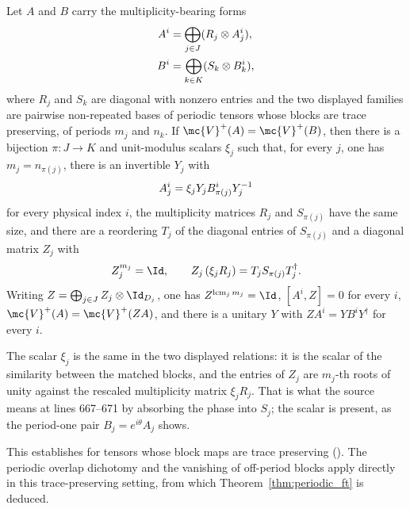 \begin{theorem}%
    \label{thm:periodic_ft_equal_case_trace_preserving}
    \leanok
    Let $A$ and $B$ carry the multiplicity-bearing forms
    \begin{align}
        A^i & =\bigoplus_{j\in J}(R_j\otimes A_j^i),
        \notag                                       \\
        B^i & =\bigoplus_{k\in K}(S_k\otimes B_k^i),
        \notag
    \end{align}
    where $R_j$ and $S_k$ are diagonal with nonzero entries and the two
    displayed families are pairwise non-repeated bases of periodic tensors
    whose blocks are trace preserving, of periods $m_j$ and $n_k$. If
    $\mc{V}^+(A)=\mc{V}^+(B)$, then there is a bijection
    $\pi\colon J\to K$ and unit-modulus scalars $\xi_j$ such that, for every
    $j$, one has $m_j=n_{\pi(j)}$, there is an invertible $Y_j$ with
    \begin{align}
        A_j^i=\xi_jY_jB_{\pi(j)}^iY_j^{-1}
        \notag
    \end{align}
    for every physical index $i$, the multiplicity matrices $R_j$ and
    $S_{\pi(j)}$ have the same size, and there are a reordering $T_j$ of the
    diagonal entries of $S_{\pi(j)}$ and a diagonal matrix $Z_j$ with
    \begin{align}
        Z_j^{m_j}=\Id,\qquad
        Z_j\left(\xi_jR_j\right)=T_jS_{\pi(j)}T_j^\dagger.
        \notag
    \end{align}
    Writing $Z=\bigoplus_{j\in J}Z_j\otimes\Id_{D_j}$, one has
    $Z^{\operatorname{lcm}_j m_j}=\Id$, $[A^i,Z]=0$ for every $i$,
    $\mc{V}^+(A)=\mc{V}^+(ZA)$, and there is a unitary $Y$ with
    $ZA^i=YB^iY^\dagger$ for every $i$.

    The scalar $\xi_j$ is the same in the two displayed relations: it is the
    scalar of the similarity between the matched blocks, and the entries of
    $Z_j$ are $m_j$-th roots of unity against the rescaled multiplicity matrix
    $\xi_jR_j$. That is what the source means at lines 667--671 by absorbing
    the phase into $S_j$; the scalar is present, as the period-one pair
    $B_j=e^{i\theta}A_j$ shows.

    This establishes
    \cite[Theorem~3.8, lines~643--693]{DeLasCuevas2017Irreducible} for tensors
    whose block maps are trace preserving
    (\cite[eq.~\emph{unital}, line~316]{DeLasCuevas2017Irreducible}). The
    periodic overlap dichotomy and the vanishing of off-period blocks apply
    directly in this trace-preserving setting, from which
    Theorem~\ref{thm:periodic_ft} is deduced.
\end{theorem}


